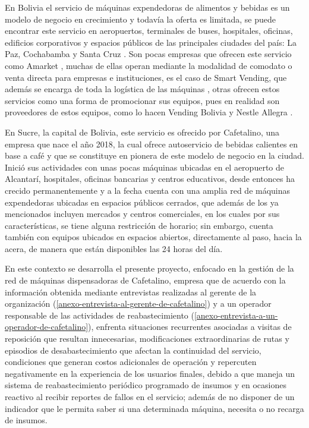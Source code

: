 En Bolivia el servicio de máquinas expendedoras de alimentos y bebidas es un modelo de negocio en crecimiento y todavía la oferta es limitada, se puede encontrar este servicio en aeropuertos, terminales de buses, hospitales, oficinas, edificios corporativos y espacios públicos de las principales ciudades del país: La Paz, Cochabamba y Santa Cruz \citep{datec2024}. Son pocas empresas que ofrecen este servicio como Amarket \citep{farmacorp2024}, muchas de ellas operan mediante la modalidad de comodato o venta directa para empresas e instituciones, es el caso de Smart Vending, que además se encarga de toda la logística de las máquinas \citep{smartvending2022}, otras ofrecen estos servicios como una forma de promocionar sus equipos, pues en realidad son proveedores de estos equipos, como lo hacen Vending Bolivia y Nestle Allegra \citep{vendingbolivia2026,nestle2026}.

En Sucre, la capital de Bolivia, este servicio es ofrecido por Cafetalino, una empresa que nace el año 2018, la cual ofrece autoservicio de bebidas calientes en base a café y que se constituye en pionera de este modelo de negocio en la ciudad. Inició sus actividades con unas pocas máquinas ubicadas en el aeropuerto de Alcantarí, hospitales, oficinas bancarias y centros educativos, desde entonces ha crecido permanentemente y a la fecha cuenta con una amplia red de máquinas expendedoras ubicadas en espacios públicos cerrados, que además de los ya mencionados incluyen mercados y centros comerciales, en los cuales por sus características, se tiene alguna restricción de horario; sin embargo, cuenta también con equipos ubicados en espacios abiertos, directamente al paso, hacia la acera, de manera que están disponibles las 24 horas del día.

En este contexto se desarrolla el presente proyecto, enfocado en la gestión de la red de máquinas dispensadoras de Cafetalino, empresa que de acuerdo con la información obtenida mediante entrevistas realizadas al gerente de la organización (\ref{anexo-entrevista-al-gerente-de-cafetalino}) y a un operador responsable de las actividades de reabastecimiento (\ref{anexo-entrevista-a-un-operador-de-cafetalino}), enfrenta situaciones recurrentes asociadas a visitas de reposición que resultan innecesarias, modificaciones extraordinarias de rutas y episodios de desabastecimiento que afectan la continuidad del servicio, condiciones que generan costos adicionales de operación y repercuten negativamente en la experiencia de los usuarios finales, debido a que maneja un sistema de reabastecimiento periódico programado de insumos y en ocasiones reactivo al recibir reportes de fallos en el servicio; además de no disponer de un indicador que le permita saber si una determinada máquina, necesita o no recarga de insumos.

